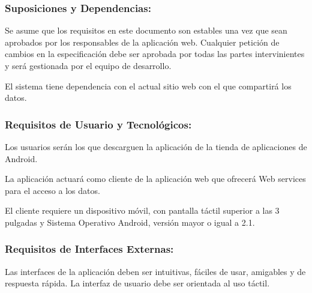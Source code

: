         \subsubsection{Suposiciones y Dependencias:}
        
            
            Se asume que los requisitos en este documento son estables una vez que sean aprobados por los responsables de la aplicación web. Cualquier petición de cambios en la especificación debe ser aprobada por todas las partes intervinientes y será gestionada por el equipo de desarrollo.
            
            
            El sistema tiene dependencia con el actual sitio web con el que compartirá los datos.
            
          \subsubsection{Requisitos de Usuario y Tecnológicos:}
        
            
            Los usuarios serán los que descarguen la aplicación de la tienda de aplicaciones de Android.
            
            
            La aplicación actuará como cliente de la aplicación web que ofrecerá Web services para el acceso a los datos.

            El cliente requiere un dispositivo móvil, con pantalla táctil superior a las 3 pulgadas y Sistema Operativo Android, versión mayor o igual a 2.1.
            
        \subsubsection{Requisitos de Interfaces Externas:}
        
            
            Las interfaces de la aplicación deben ser intuitivas, fáciles de usar, amigables y de respuesta rápida. La interfaz de usuario debe ser orientada al uso táctil.
            
            
